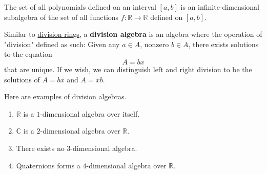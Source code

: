   \begin{example}
    \label{ex:polynomials-as-a-subalgebra}
    The set of all polynomials defined on an interval $[a,b]$ is an infinite-dimensional subalgebra of the set of all functions $f: \mathbb{R} \to \mathbb{R}$ defined on $[a,b]$.
  \end{example}

  \begin{definition}
    \label{def:division-algebra}
    Similar to \hyperref[def:division-ring]{division rings}, a \textbf{division algebra} is an algebra where the operation of "division" defined as such: Given any $a \in A$, nonzero $b \in A$, there exists solutions to the equation
    \begin{equation}
      A = bx
    \end{equation}
    that are unique. If we wish, we can distinguish left and right division to be the solutions of $A = b x$ and $A = x b$. 
  \end{definition}

  \begin{example}
    \label{ex:examples-of-division-algebras}
    Here are examples of division algebras.
    \begin{enumerate}
      \item $\mathbb{R}$ is a $1$-dimensional algebra over itself. 
      \item $\mathbb{C}$ is a $2$-dimensional algebra over $\mathbb{R}$. 
      \item There exists no $3$-dimensional algebra. 
      \item Quaternions forms a $4$-dimensional algebra over $\mathbb{R}$. 
    \end{enumerate}
  \end{example}

